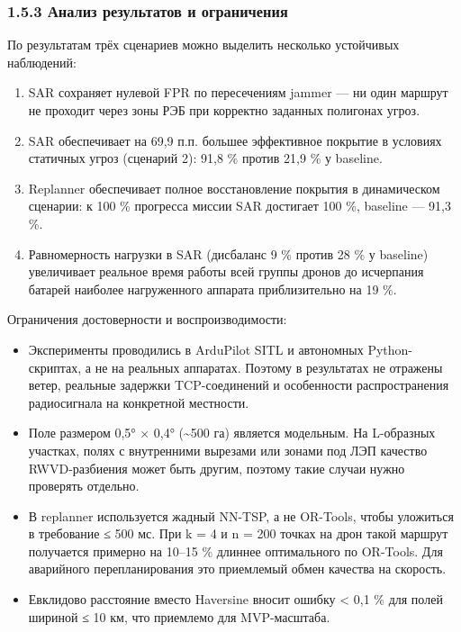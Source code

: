 \documentclass[14pt,a4paper]{extarticle}
\providecommand{\tightlist}{%
  \setlength{\itemsep}{0pt}\setlength{\parskip}{0pt}}
\begin{document}
\hypertarget{ux430ux43dux430ux43bux438ux437-ux440ux435ux437ux443ux43bux44cux442ux430ux442ux43eux432-ux438-ux43eux433ux440ux430ux43dux438ux447ux435ux43dux438ux44f}{%
\subsubsection{1.5.3 Анализ результатов и ограничения}\label{ux430ux43dux430ux43bux438ux437-ux440ux435ux437ux443ux43bux44cux442ux430ux442ux43eux432-ux438-ux43eux433ux440ux430ux43dux438ux447ux435ux43dux438ux44f}}

По результатам трёх сценариев можно выделить несколько устойчивых наблюдений:

\begin{enumerate}
\def\labelenumi{\arabic{enumi}.}
\item
  SAR сохраняет нулевой FPR по пересечениям jammer --- ни один маршрут не проходит через зоны РЭБ при корректно заданных полигонах угроз.
\item
  SAR обеспечивает на 69,9 п.п. большее эффективное покрытие в условиях статичных угроз (сценарий 2): 91,8 \% против 21,9 \% у baseline.
\item
  Replanner обеспечивает полное восстановление покрытия в динамическом сценарии: к 100 \% прогресса миссии SAR достигает 100 \%, baseline --- 91,3 \%.
\item
  Равномерность нагрузки в SAR (дисбаланс 9 \% против 28 \% у baseline) увеличивает реальное время работы всей группы дронов до исчерпания батарей наиболее нагруженного аппарата приблизительно на 19 \%.
\end{enumerate}

Ограничения достоверности и воспроизводимости:

\begin{itemize}
\tightlist
\item
  Эксперименты проводились в ArduPilot SITL и автономных Python-скриптах, а не на реальных аппаратах. Поэтому в результатах не отражены ветер, реальные задержки TCP-соединений и особенности распространения радиосигнала на конкретной местности.
\item
  Поле размером 0,5° × 0,4° (\textasciitilde500 га) является модельным. На L-образных участках, полях с внутренними вырезами или зонами под ЛЭП качество RWVD-разбиения может быть другим, поэтому такие случаи нужно проверять отдельно.
\item
  В replanner используется жадный NN-TSP, а не OR-Tools, чтобы уложиться в требование ≤ 500 мс. При k = 4 и n = 200 точках на дрон такой маршрут получается примерно на 10--15 \% длиннее оптимального по OR-Tools. Для аварийного перепланирования это приемлемый обмен качества на скорость.
\item
  Евклидово расстояние вместо Haversine вносит ошибку \textless{} 0,1 \% для полей шириной ≤ 10 км, что приемлемо для MVP-масштаба.
\end{itemize}
\end{document}
